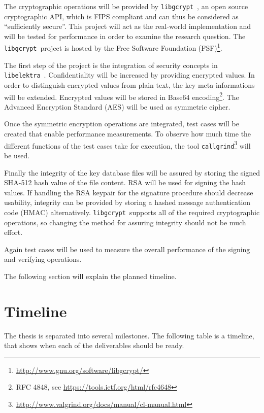 \documentclass[a4paper,12pt]{article}
\newcommand{\libelektra}{\texttt{libelektra}~}
\newcommand{\libgcrypt}{\texttt{libgcrypt}~}
\begin{document}
The cryptographic operations will be provided by \libgcrypt, an open source cryptographic API, which is FIPS compliant and can thus be considered as ``sufficiently secure''.
This project will act as the real-world implementation and will be tested for performance in order to examine the research question.
The \libgcrypt project is hosted by the Free Software Foundation (FSF)\footnote{\url{http://www.gnu.org/software/libgcrypt/}}.

The first step of the project is the integration of security concepts in \libelektra. 
Confidentiality will be increased by providing encrypted values. 
In order to distinguish encrypted values from plain text, the key meta-informations will be extended. 
Encrypted values will be stored in Base64 encoding\footnote{RFC 4848, see \url{https://tools.ietf.org/html/rfc4648}}.
The Advanced Encryption Standard (AES) will be used as symmetric cipher.

Once the symmetric encryption operations are integrated, test cases will be created that enable performance measurements.
To observe how much time the different functions of the test cases take for execution, the tool \texttt{callgrind}\footnote{\url{http://www.valgrind.org/docs/manual/cl-manual.html}} will be used.

Finally the integrity of the key database files will be assured by storing the signed SHA-512 hash value of the file content. 
RSA will be used for signing the hash values. 
If handling the RSA keypair for the signature procedure should decrease usability, integrity can be provided by storing a hashed message authentication code (HMAC) alternatively.
\libgcrypt supports all of the required cryptographic operations, so changing the method for assuring integrity should not be much effort.

Again test cases will be used to measure the overall performance of the signing and verifying operations.

The following section will explain the planned timeline.

\section{Timeline}

The thesis is separated into several milestones. The following table is a timeline, that shows when each of the deliverables should be ready.
\end{document}
